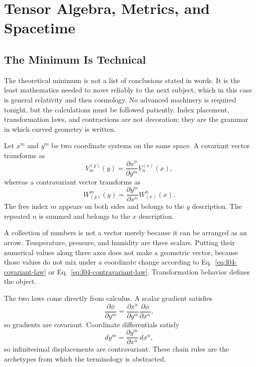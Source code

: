 \chapter{Tensor Algebra, Metrics, and Spacetime}

\section{The Minimum Is Technical}

The theoretical minimum is not a list of conclusions stated in words. It is
the least mathematics needed to move reliably to the next subject, which in
this case is general relativity and then cosmology. No advanced machinery is
required tonight, but the calculations must be followed patiently. Index
placement, transformation laws, and contractions are not decoration; they
are the grammar in which curved geometry is written.

Let \(x^{m}\) and \(y^{m}\) be two coordinate systems on the same space. A
covariant vector transforms as
\begin{equation}
  V_{m}^{(y)}(y)
  =
  \frac{\partial x^{n}}{\partial y^{m}}
  V_{n}^{(x)}(x),
  \label{eq:l04-covariant-law}
\end{equation}
whereas a contravariant vector transforms as
\begin{equation}
  W_{(y)}^{m}(y)
  =
  \frac{\partial y^{m}}{\partial x^{n}}
  W_{(x)}^{n}(x).
  \label{eq:l04-contravariant-law}
\end{equation}
The free index \(m\) appears on both sides and belongs to the \(y\)
description. The repeated \(n\) is summed and belongs to the \(x\)
description.

A collection of numbers is not a vector merely because it can be arranged
as an arrow. Temperature, pressure, and humidity are three scalars. Putting
their numerical values along three axes does not make a geometric vector,
because those values do not mix under a coordinate change according to
Eq.~\eqref{eq:l04-covariant-law} or
Eq.~\eqref{eq:l04-contravariant-law}. Transformation behavior defines the
object.

The two laws come directly from calculus. A scalar gradient satisfies
\begin{equation}
  \frac{\partial\phi}{\partial y^{m}}
  =
  \frac{\partial x^{n}}{\partial y^{m}}
  \frac{\partial\phi}{\partial x^{n}},
  \label{eq:l04-gradient-chain-rule}
\end{equation}
so gradients are covariant. Coordinate differentials satisfy
\begin{equation}
  dy^{m}
  =
  \frac{\partial y^{m}}{\partial x^{n}}\,dx^{n},
  \label{eq:l04-differential-chain-rule}
\end{equation}
so infinitesimal displacements are contravariant. These chain rules are the
archetypes from which the terminology is abstracted.


